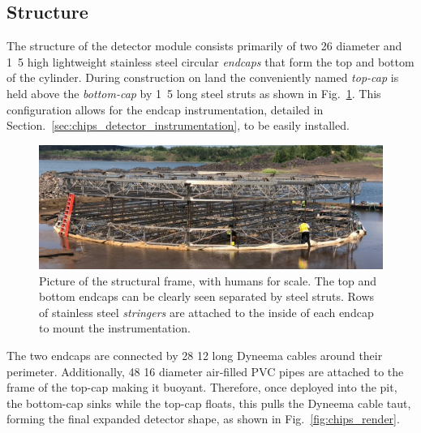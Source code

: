 \subsection{Structure} %
\label{sec:chips_detector_structure} %

The structure of the \chipsfive detector module consists primarily of two \unit{26}{}
diameter and \unit{1.5}{} high lightweight stainless steel circular \emph{endcaps} that
form the top and bottom of the cylinder. During construction on land the conveniently named
\emph{top-cap} is held above the \emph{bottom-cap} by \unit{1.5}{} long steel struts as
shown in Fig.~\ref{fig:frame}. This configuration allows for the endcap instrumentation, detailed
in Section.~\ref{sec:chips_detector_instrumentation}, to be easily installed.

\begin{figure} %
    \includegraphics[width=\textwidth]{diagrams/4-chips/frame.jpeg}
    \caption[Picture of the \chipsfive structural frame.]
    {Picture of the \chipsfive structural frame, with humans for scale. The top and bottom endcaps
        can be clearly seen separated by steel struts. Rows of stainless steel \emph{stringers}
        are attached to the inside of each endcap to mount the instrumentation.}
    \label{fig:frame}
\end{figure}

The two endcaps are connected by 28 \unit{12}{} long Dyneema cables around their
perimeter. Additionally, 48 \unit{16}{} diameter air-filled PVC pipes are attached to
the frame of the top-cap making it buoyant. Therefore, once deployed into the pit, the bottom-cap
sinks while the top-cap floats, this pulls the Dyneema cable taut, forming the final expanded
detector shape, as shown in Fig.~\ref{fig:chips_render}.

